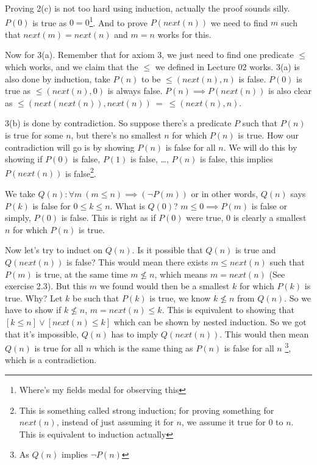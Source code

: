 \documentclass[a4paper,10pt]{article}
\theoremstyle{definition} %
\begin{document}
    Proving 2(c) is not too hard using induction, actually the proof sounds silly.
    $P(0)$ is true as $0 = 0$\footnote{Where's my fields medal for observing this}.
    And to prove $P(next(n))$ we need to find $m$ such that $next(m) = next(n)$ and
    $m = n$ works for this.

    Now for 3(a). Remember that for axiom 3, we just need to find one predicate $\leq$
    which works, and we claim that the $\leq$ we defined in Lecture 02 works. 3(a) is
    also done by induction, take $P(n)$ to be $\leq(next(n),n)$ is false. $P(0)$ is 
    true as $\leq(next(n), 0)$ is always false. $P(n) \implies P(next(n))$ is also clear as
    $\leq(next(next(n)), next(n)) \ = \ \leq(next(n), n)$.

    3(b) is done by contradiction. So suppose there's a predicate $P$ such that $P(n)$
    is true for some $n$, but there's no smallest $n$ for which $P(n)$ is true. How our
    contradiction will go is by showing $P(n)$ is false for all $n$. We will do this by 
    showing if $P(0)$ is false, $P(1)$ is false, \dots, $P(n)$ is false, this implies
    $P(next(n))$ is false\footnote{This is something called strong induction; for proving
    something for $next(n)$, instead of just assuming it for $n$, we assume it true for
    $0$ to $n$. This is equivalent to induction actually}.

    We take $Q(n): \forall m \ (m \leq n) \implies (\lnot P(m))$ or in other words,
    $Q(n)$ says $P(k)$ is false for $0 \leq k \leq n$. What is $Q(0)$? $m \leq 0
    \implies P(m)$ is false or simply, $P(0)$ is false. This is right as if $P(0)$
    were true, 0 is clearly a smallest $n$ for which $P(n)$ is true.

    \newpage
    Now let's try to induct on $Q(n)$. Is it possible that $Q(n)$ is true and 
    $Q(next(n))$ is false? This would mean there exists $m \leq next(n)$ such that 
    $P(m)$ is true, at the same time $m \nleq n$, which means $m = next(n)$ (See exercise 2.3). 
    But this $m$ we found would then be a smallest $k$ for which $P(k)$ is true. Why? 
    Let $k$ be such that $P(k)$ is true, we know $k \nleq n$ from $Q(n)$.
    So we have to show
    if $k \nleq n$, $m = next(n) \leq k$. This is equivalent to showing that 
    $[k \leq n] \lor [next(n) \leq k]$ which can be shown by nested induction. So we got
    that it's impossible, $Q(n)$ has to imply $Q(next(n))$. This would then mean
    $Q(n)$ is true for all $n$ which is the same thing as $P(n)$ is false for all $n$
    \footnote{As $Q(n)$ implies $\lnot P(n)$},
    which is a contradiction.
\end{document}
